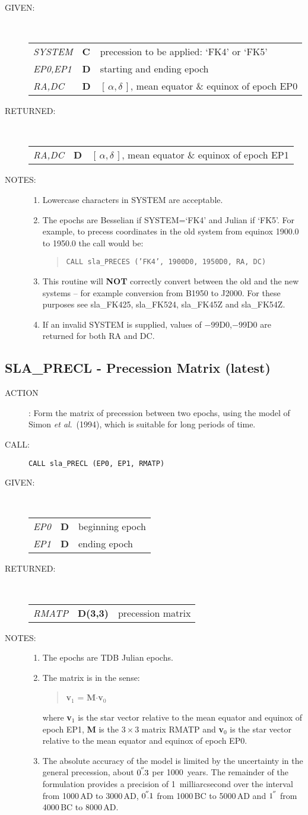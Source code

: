 \documentclass[11pt,twoside]{article}
\newcommand{\xlabel}[1]{}
\newcommand{\radec}     {$[\,\alpha,\delta\,]$}
\newcommand{\arcsec}[2] {\arcseci{#1}$\hspace{-0.4em}.#2$}
\newcommand{\arcsec}[2] {
      {$#1\hspace{-0.05em}^{'\hspace{-0.1em}'}\hspace{-0.4em}.#2$}
   }
\newcommand{\arcseci}[1] {$#1\hspace{-0.05em}$\raisebox{-0.5ex}
                         {$^{'\hspace{-0.1em}'}$}}
\renewcommand{\arcseci}[1] {$#1\hspace{-0.05em}^{'\hspace{-0.1em}'}$}
\newcommand{\routine}[3]
{\hbadness=10000
  \vbox
  {
    \rule{\textwidth}{0.3mm}\\
    {\Large {\bf #1} \hfill #2 \hfill {\bf #1}}\\
    \setlength{\oldspacing}{\topsep}
    \setlength{\topsep}{0.3ex}
    \begin{description}
      #3
    \end{description}
    \setlength{\topsep}{\oldspacing}
  }
}
\renewcommand{\routine}[3]
   {
      \subsection{#1\xlabel{#1} - #2\label{#1}}
       \begin{description}
         #3
       \end{description}
   }
\newcommand{\action}[1]
{\item[ACTION]: #1}
\newcommand{\action}[1]
   {\item[ACTION:] #1}
\newcommand{\call}[1]
{\item[CALL]: \hspace{0.4em}{\tt #1}}
\newlength{\oldspacing}
\renewcommand{\call}[1]
   {
    \item[CALL:] {\tt #1}
   }
\newcommand{\args}[2]
{
  \goodbreak
  \setlength{\oldspacing}{\topsep}
  \setlength{\topsep}{0.3ex}
  \begin{description}
  \item[#1]:\\[1.5ex]
    \begin{tabular}{p{7em}p{6em}p{22em}}
      #2
    \end{tabular}
  \end{description}
  \setlength{\topsep}{\oldspacing}
}
\renewcommand{\args}[2]
   {
     \begin{description}
        \item[#1:]\\
        \begin{tabular}{p{7em}p{6em}l}
           #2
        \end{tabular}
     \end{description}
   }
\newcommand{\spec}[3]
{
  {\em {#1}} & {\bf \mbox{#2}} & {#3}
}
\newcommand{\notes}[1]
{
  \goodbreak
  \setlength{\oldspacing}{\topsep}
  \setlength{\topsep}{0.3ex}
  \begin{description}
    \item[NOTES]:
        #1
  \end{description}
  \setlength{\topsep}{\oldspacing}
}
\renewcommand{\notes}[1]
   {
      \begin{description}
         \item[NOTES:]
            #1
      \end{description}
   }
\begin{document}
\args{GIVEN}
{
 \spec{SYSTEM}{C}{precession to be applied: `FK4' or `FK5'} \\
 \spec{EP0,EP1}{D}{starting and ending epoch} \\
 \spec{RA,DC}{D}{\radec, mean equator \& equinox of epoch EP0}
}
\args{RETURNED}
{
 \spec{RA,DC}{D}{\radec, mean equator \& equinox of epoch EP1}
}
\notes
{
 \begin{enumerate}
  \item Lowercase characters in SYSTEM are acceptable.
  \item The epochs are Besselian if SYSTEM=`FK4' and Julian if `FK5'.
        For example, to precess coordinates in the old system from
        equinox 1900.0 to 1950.0 the call would be:
        \begin{quote}
         {\tt CALL sla\_PRECES ('FK4', 1900D0, 1950D0, RA, DC)}
        \end{quote}
  \item This routine will {\bf NOT} correctly convert between the old and
        the new systems -- for example conversion from B1950 to J2000.
        For these purposes see sla\_FK425, sla\_FK524, sla\_FK45Z and
        sla\_FK54Z.
  \item If an invalid SYSTEM is supplied, values of $-$99D0,$-$99D0 are
        returned for both RA and DC.
 \end{enumerate}
}
\routine{SLA\_PRECL}{Precession Matrix (latest)}
{
 \action{Form the matrix of precession between two epochs, using the
         model of Simon {\it et al}.\ (1994), which is suitable for long
         periods of time.}
 \call{CALL sla\_PRECL (EP0, EP1, RMATP)}
}
\args{GIVEN}
{
 \spec{EP0}{D}{beginning epoch} \\
 \spec{EP1}{D}{ending epoch}
}
\args{RETURNED}
{
 \spec{RMATP}{D(3,3)}{precession matrix}
}
\notes
{
 \begin{enumerate}
  \item The epochs are TDB Julian epochs.
  \item The matrix is in the sense:
        \begin{verse}
         {\bf v}$_{1}$ =  {\bf M}$\cdot${\bf v}$_{0}$
        \end{verse}
        where {\bf v}$_{1}$ is the star vector relative to the
        mean equator and equinox of epoch EP1, {\bf M} is the
        $3\times3$ matrix RMATP and
        {\bf v}$_{0}$ is the star vector relative to the
        mean equator and equinox of epoch EP0.
  \item The absolute accuracy of the model is limited by the
        uncertainty in the general precession, about \arcsec{0}{3} per
        1000~years.  The remainder of the formulation provides a
        precision of 1~milliarcsecond over the interval from 1000\,AD
        to 3000\,AD, \arcsec{0}{1} from 1000\,BC to 5000\,AD and
        \arcseci{1} from 4000\,BC to 8000\,AD.
 \end{enumerate}
}
\end{document}
